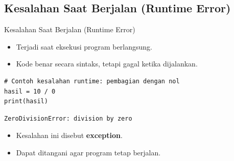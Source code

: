 \documentclass[aspectratio=169, table]{beamer}
\begin{document}
\subsection*{Kesalahan Saat Berjalan (Runtime Error)}
\begin{frame}[fragile]{Kesalahan Saat Berjalan (Runtime Error)}
\vspace*{20pt}
\begin{itemize}
  \item Terjadi saat eksekusi program berlangsung.
  \item Kode benar secara sintaks, tetapi gagal ketika dijalankan.
\end{itemize}

\begin{lstlisting}[style=PythonStyle]
# Contoh kesalahan runtime: pembagian dengan nol
hasil = 10 / 0
print(hasil)
\end{lstlisting}

\begin{lstlisting}[language=bash]
ZeroDivisionError: division by zero
\end{lstlisting}

\begin{itemize}
  \item Kesalahan ini disebut \textbf{exception}.
  \item Dapat ditangani agar program tetap berjalan.
\end{itemize}
\end{frame}

\end{document}
